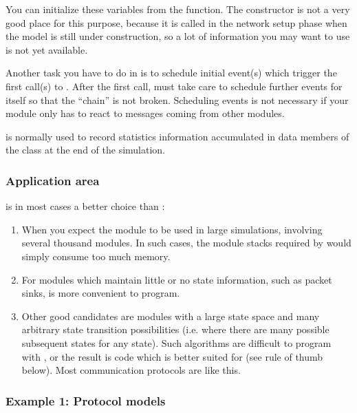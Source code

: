 You can initialize these variables from the 
function.  The constructor is not a very good place
for this purpose, because it is called in the network setup phase when
the model is still under construction, so a lot of information you may
want to use is not yet available.

Another task you have to do in  is to schedule
initial event(s) which trigger the first call(s)
to .  After the first call,
 must take care to schedule further events for
itself so that the ``chain'' is not broken. Scheduling events is not
necessary if your module only has to react to messages coming from
other modules.

 is normally used to record statistics information
accumulated in data members of the class at the end of the simulation.


\subsubsection{Application area}


 is in most cases a better choice than :

\begin{enumerate}
  \item{When you expect the module to be used in large simulations,
      involving several thousand modules. In such cases, the module stacks
      required by  would simply consume too much memory.}
  \item{For modules which maintain little or no state information,
      such as packet sinks,  is more convenient to program.}
  \item{Other good candidates are modules with a large state space and
      many arbitrary state transition possibilities (i.e. where there
      are many possible subsequent states for any state). Such algorithms
      are difficult to program with , or the result is code
      which is better suited for  (see rule of thumb
      below). Most communication protocols are like this.}
\end{enumerate}


\subsubsection{Example 1: Protocol models}

